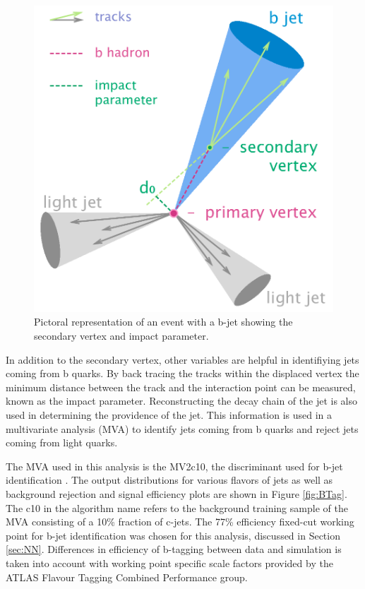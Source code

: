 \begin{figure}[h!]
	\centering
	\includegraphics[width=.5\columnwidth]{../ThesisImages/Simulation/B-tagging_diagram.png}
	\caption[Pictoral representation of an event with a b-jet showing the secondary vertex and impact parameter.]{Pictoral representation of an event with a b-jet showing the secondary vertex and impact parameter\cite{BTagImg}. 
	}
	\label{fig:BTagVars}
\end{figure}

In addition to the secondary vertex, other variables are helpful in identifiying jets coming from b quarks.  By back tracing the tracks within the displaced vertex the minimum distance between the track and the interaction point can be measured, known as the impact parameter.  Reconstructing the decay chain of the jet is also used in determining the providence of the jet.  This information is used in a multivariate analysis (MVA) to identify jets coming from b quarks and reject jets coming from light quarks.

The MVA used in this analysis is the MV2c10, the discriminant used for b-jet identification \cite{BJet1718}.  The output distributions for various flavors of jets as well as background rejection and signal efficiency plots are shown in Figure \ref{fig:BTag}.  The c10 in the algorithm name refers to the background training sample of the MVA consisting of a 10\% fraction of c-jets.  The 77\% efficiency fixed-cut working point for b-jet identification was chosen for this analysis, discussed in Section \ref{sec:NN}.  Differences in efficiency of b-tagging between data and simulation is taken into account with working point specific scale factors provided by the ATLAS Flavour Tagging Combined Performance group.

